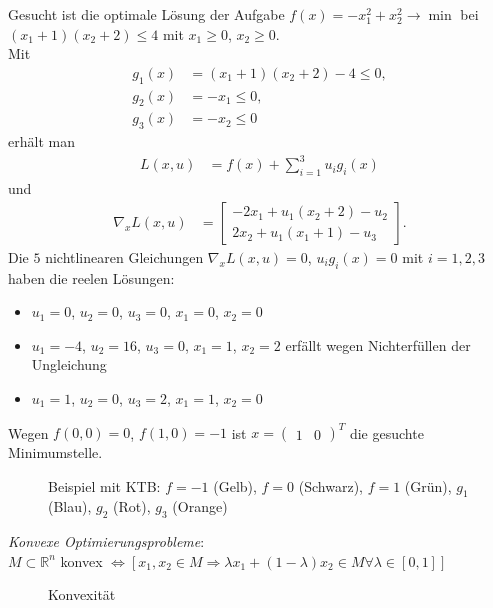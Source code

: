 \begin{exmp}
Gesucht ist die optimale Lösung der Aufgabe $f(x)=-x^2_1+x_2^2\rightarrow\min$ bei $(x_1+1)(x_2+2)\le 4$ mit $x_1\ge 0$, $x_2\ge 0$.\\
Mit 
\begin{align*}
	g_1(x) & = (x_1+1)(x_2+2)-4\le 0,\\
	g_2(x) & = -x_1\le 0,\\
	g_3(x) & = -x_2\le 0 
\end{align*}
erhält man
\begin{align*}
	L(x,u) & = f(x)+\sum\limits_{i=1}^3u_ig_i(x)
\end{align*}
und
\begin{align*}
\nabla_x L(x,u) & = \begin{bmatrix}
-2x_1+u_1(x_2+2)-u_2\\
2x_2+u_1(x_1+1)-u_3
\end{bmatrix}.
\end{align*}
Die $5$ nichtlinearen Gleichungen $\nabla_x L(x,u)=0$, $u_ig_i(x)=0$ mit $i=1,2,3$ haben die reelen Lösungen:
\begin{itemize}
	\item $u_1=0$, $u_2=0$, $u_3=0$, $x_1=0$, $x_2=0$
	\item $u_1=-4$, $u_2=16$, $u_3=0$, $x_1=1$, $x_2=2$ erfällt wegen Nichterfüllen der Ungleichung 
	\item $u_1=1$, $u_2=0$, $u_3=2$, $x_1=1$, $x_2=0$
\end{itemize}
Wegen $f(0,0)=0$, $f(1,0)=-1$ ist $x=\begin{pmatrix} 1 & 0 \end{pmatrix}^T$ die gesuchte Minimumstelle.
\begin{figure}[!htb]
	\centering
	
	\caption{Beispiel mit \ac{KTB}: $f=-1$ (Gelb), $f=0$ (Schwarz), $f=1$ (Grün), $g_1$ (Blau), $g_2$ (Rot), $g_3$ (Orange)}
	\label{fig:kap_1_ktp}
\end{figure}
\end{exmp}

\textit{Konvexe Optimierungsprobleme}:\\
$M\subset\mathbb{R}^n$ konvex $\Leftrightarrow \left[x_1,x_2\in M\Rightarrow \lambda x_1+(1-\lambda)x_2\in M\forall\lambda\in[0,1]\right]$
\begin{figure}[!htb]
	\centering
	\subfloat[konvex]{}\qquad
	\caption{Konvexität}
	\label{fig:kap_1_konvex}
\end{figure}

